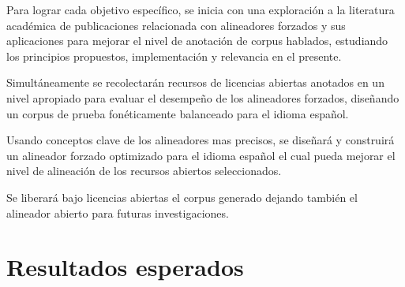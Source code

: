 Para lograr cada objetivo específico, se inicia con una exploración a la literatura académica de publicaciones relacionada con alineadores forzados y sus aplicaciones para mejorar el nivel de anotación de corpus hablados, estudiando los principios propuestos, implementación y relevancia en el presente.


Simultáneamente se recolectarán recursos de licencias abiertas anotados en un nivel apropiado para evaluar el desempeño de los alineadores forzados, diseñando un corpus de prueba fonéticamente balanceado para el idioma español.

Usando conceptos clave de los alineadores mas precisos, se diseñará y construirá un alineador forzado optimizado para el idioma español el cual pueda mejorar el nivel de alineación de los recursos abiertos seleccionados.

Se liberará bajo licencias abiertas el corpus generado dejando también el alineador abierto para futuras investigaciones.



\section{Resultados esperados}

